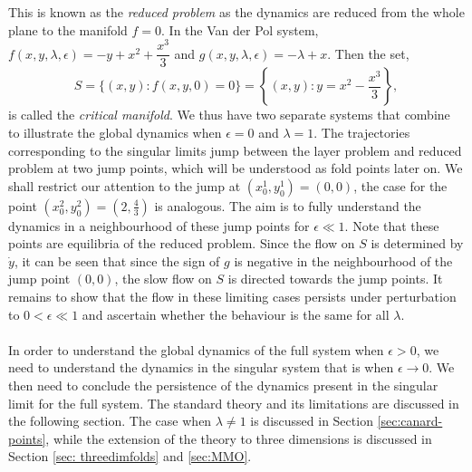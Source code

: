 This is known as the \emph{reduced problem} as the dynamics are reduced from the whole plane to the manifold $f=0$. In the Van der Pol system, $f(x,y,\lambda,\epsilon)=-y+x^2+\dfrac{x^3}{3}$ and $g(x,y,\lambda,\epsilon)=-\lambda+x$. Then the set,
\begin{equation}
 S= \{ (x,y) : f(x,y,0)=0 \} = \left\{ (x,y) : y = x^2-\dfrac{x^3}{3}\right \},\label{CriticalS}
\end{equation} 
is called the \emph{critical manifold}. We thus have two separate systems that combine to illustrate the global dynamics when $\epsilon =0$ and $\lambda = 1$. 
The trajectories corresponding to the singular limits jump between the layer problem and reduced problem at two jump points, which will be understood as fold points later on. We shall restrict our attention to the jump at $ (x^1_0,y^1_0)=(0,0)$, the case for the point $(x^2_0,y^2_0)=(2,\frac{4}{3})$ is analogous. The aim is to fully understand the dynamics in a neighbourhood of these jump points for $\epsilon \ll 1$. Note that these points are equilibria of the reduced problem. Since the flow on $S$ is determined by $\dot{y}$, it can be seen that since the sign of $g$ is negative in the neighbourhood of the jump point $(0,0)$, the slow flow on $S$ is directed towards the jump points. It remains to show that the flow in these limiting cases persists under perturbation to $0<\epsilon \ll 1$ and ascertain whether the behaviour is the same for all $\lambda$.  
\\
\\
In order to understand the global dynamics of the full system when $\epsilon >0$, we need to understand the dynamics in the singular system that is when $\epsilon \to 0$. We then need to conclude the persistence of the dynamics present in the singular limit for the full system. The standard theory and its limitations are discussed in the following section. The case when $\lambda \neq 1$ is discussed in Section \ref{sec:canard-points}, while the extension of the theory to three dimensions is discussed in Section \ref{sec: threedimfolds} and \ref{sec:MMO}.

